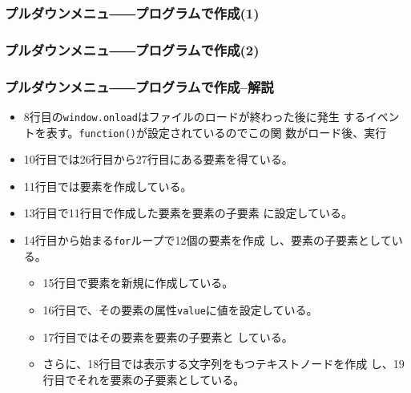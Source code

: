 \begin{frame}[containsverbatim]
 \frametitle{プルダウンメニュ――プログラムで作成(1)}
\end{frame}
\begin{frame}[containsverbatim]
 \frametitle{プルダウンメニュ――プログラムで作成(2)}
\end{frame}
\begin{frame}[containsverbatim]
 \frametitle{プルダウンメニュ――プログラムで作成--解説}
\begin{itemize}
 \item 8行目の\texttt{window.onload}はファイルのロードが終わった後に発生
       するイベントを表す。\texttt{function()}が設定されているのでこの関
       数がロード後、実行
 \item 10行目では26行目から27行目にある要素を得ている。
 \item 11行目では要素を作成している。
 \item 13行目で11行目で作成した要素を要素の子要素
       に設定している。
 \item 14行目から始まる\texttt{for}ループで12個の要素を作成
       し、要素の子要素としている。
       \begin{itemize}
	\item 15行目で要素を新規に作成している。
	\item 16行目で、その要素の属性\texttt{value}に値を設定している。
	\item 17行目ではその要素を要素の子要素と
	      している。
	\item さらに、18行目では表示する文字列をもつテキストノードを作成
	      し、19行目でそれを要素の子要素としている。
       \end{itemize}
\end{itemize}
\end{frame}
\newcommand{\DOMP}{\texttt}
